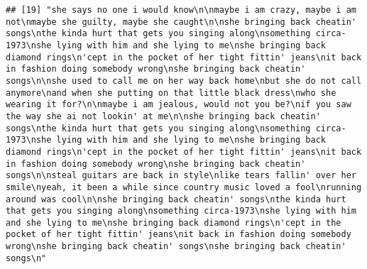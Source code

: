 \documentclass[]{article}
\begin{document}
\begin{verbatim}
## [19] "she says no one i would know\n\nmaybe i am crazy, maybe i am not\nmaybe she guilty, maybe she caught\n\nshe bringing back cheatin' songs\nthe kinda hurt that gets you singing along\nsomething circa-1973\nshe lying with him and she lying to me\nshe bringing back diamond rings\n'cept in the pocket of her tight fittin' jeans\nit back in fashion doing somebody wrong\nshe bringing back cheatin' songs\n\nshe used to call me on her way back home\nbut she do not call anymore\nand when she putting on that little black dress\nwho she wearing it for?\n\nmaybe i am jealous, would not you be?\nif you saw the way she ai not lookin' at me\n\nshe bringing back cheatin' songs\nthe kinda hurt that gets you singing along\nsomething circa-1973\nshe lying with him and she lying to me\nshe bringing back diamond rings\n'cept in the pocket of her tight fittin' jeans\nit back in fashion doing somebody wrong\nshe bringing back cheatin' songs\n\nsteal guitars are back in style\nlike tears fallin' over her smile\nyeah, it been a while since country music loved a fool\nrunning around was cool\n\nshe bringing back cheatin' songs\nthe kinda hurt that gets you singing along\nsomething circa-1973\nshe lying with him and she lying to me\nshe bringing back diamond rings\n'cept in the pocket of her tight fittin' jeans\nit back in fashion doing somebody wrong\nshe bringing back cheatin' songs\nshe bringing back cheatin' songs\n"                                                                                                                                                                                                                                                                                                                                                                                                                                                                                                                                                                                                                                                                                                                                                                                                                                                                                                                                                                                                                                                                                                                                                                                                                                                                                                                                                                                                                                                                                                           

\end{verbatim}
\end{document}
